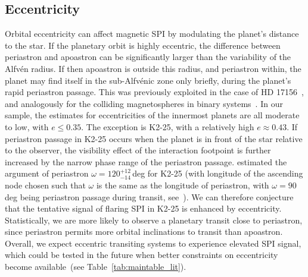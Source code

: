 \documentclass[twocolumn]{aastex631}
\begin{document}
\subsection{Eccentricity}
\label{sec:discussion:eccentricity}
Orbital eccentricity can affect magnetic SPI by modulating the planet's distance to the star. If the planetary orbit is highly eccentric, the difference between periastron and apoastron can be significantly larger than the variability of the Alfv\'en radius. If then apoastron is outside this radius, and periastron within, the planet may find itself in the sub-Alfv\'enic zone only briefly, during the planet's rapid periastron passage. This was previously exploited in the case of HD 17156~\citep{maggio2015coordinated}, and analogously for the colliding magnetospheres in binary systems~\citep{massi2002periodic,getman2016search,das2023discovery}. In our sample, the estimates for eccentricities of the innermost planets are all moderate to low, with $e\leq 0.35$. The exception is K2-25, with a relatively high $e\approx0.43$. If periastron passage in K2-25 occurs when the planet is in front of the star relative to the observer, the visibility effect of the interaction footpoint is further increased by the narrow phase range of the periastron passage. \citet{stefansson2020habitable} estimated the argument of periastron $\omega=120^{+12}_{-14}\,$deg for K2-25 (with longitude of the ascending node chosen such that $\omega$ is the same as the longitude of periastron, with $\omega=90\,$deg being periastron passage during transit, see~\citealt{kipping2010investigations,dawson2012photoeccentric}). We can therefore conjecture that the tentative signal of flaring SPI in K2-25 is enhanced by eccentricity. Statistically, we are more likely to observe a planetary transit close to periastron, since periastron permits more orbital inclinations to transit than apoastron. Overall, we expect eccentric transiting systems to experience elevated SPI signal, which could be tested in the future when better constraints on eccentricity become available~(see Table~\ref{tab:maintable_lit}).

\end{document}
